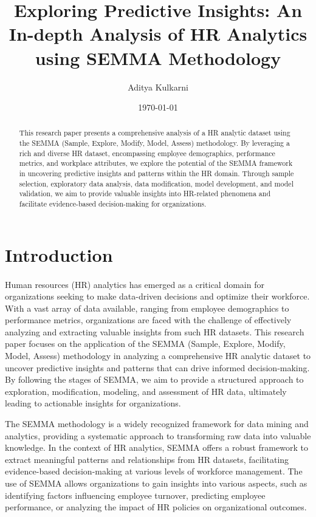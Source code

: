\documentclass{article}
\title{Exploring Predictive Insights: An In-depth Analysis of HR Analytics using SEMMA Methodology}
\author{Aditya Kulkarni}
\date{\today}
\begin{document}
\maketitle

\begin{abstract}
This research paper presents a comprehensive analysis of a HR analytic dataset using the SEMMA (Sample, Explore, Modify, Model, Assess) methodology. By leveraging a rich and diverse HR dataset, encompassing employee demographics, performance metrics, and workplace attributes, we explore the potential of the SEMMA framework in uncovering predictive insights and patterns within the HR domain. Through sample selection, exploratory data analysis, data modification, model development, and model validation, we aim to provide valuable insights into HR-related phenomena and facilitate evidence-based decision-making for organizations.
\end{abstract}

\section{Introduction}
\paragraph{}
Human resources (HR) analytics has emerged as a critical domain for organizations seeking to make data-driven decisions and optimize their workforce. With a vast array of data available, ranging from employee demographics to performance metrics, organizations are faced with the challenge of effectively analyzing and extracting valuable insights from such HR datasets. This research paper focuses on the application of the SEMMA (Sample, Explore, Modify, Model, Assess) methodology in analyzing a comprehensive HR analytic dataset to uncover predictive insights and patterns that can drive informed decision-making. By following the stages of SEMMA, we aim to provide a structured approach to exploration, modification, modeling, and assessment of HR data, ultimately leading to actionable insights for organizations.

The SEMMA methodology is a widely recognized framework for data mining and analytics, providing a systematic approach to transforming raw data into valuable knowledge. In the context of HR analytics, SEMMA offers a robust framework to extract meaningful patterns and relationships from HR datasets, facilitating evidence-based decision-making at various levels of workforce management. The use of SEMMA allows organizations to gain insights into various aspects, such as identifying factors influencing employee turnover, predicting employee performance, or analyzing the impact of HR policies on organizational outcomes.
\end{document}

